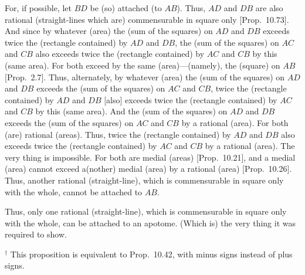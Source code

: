 \begin{Parallel}{}{}
{For, if possible, let $BD$ be (so) attached (to $AB$). Thus, $AD$ and $DB$ are also
rational (straight-lines which are) commensurable in square only [Prop.~10.73]. And since by whatever (area)
the (sum of the squares) on $AD$ and $DB$ exceeds twice the
(rectangle contained) by $AD$ and $DB$, the (sum of the squares)
on $AC$ and $CB$ also exceeds twice the (rectangle contained) by $AC$ and
$CB$ by this (same area). For both exceed by the same (area)---(namely), the (square)
on $AB$ [Prop.~2.7]. Thus, alternately, 
by whatever (area) the (sum of the squares) on $AD$ and 
$DB$ exceeds the (sum of the squares) on $AC$ and $CB$, 
 twice the (rectangle contained) by $AD$ and $DB$
[also] exceeds twice the (rectangle contained) by $AC$ and $CB$ by this (same area).
And the (sum of the squares) on $AD$ and $DB$ exceeds the (sum
of the squares) on $AC$ and $CB$ by a rational (area). For both
(are) rational (areas). Thus, twice the (rectangle contained) by $AD$ and $DB$ also
exceeds twice the (rectangle contained) by $AC$ and $CB$ by a
rational (area). The very thing is impossible. For both are
medial (areas) [Prop.~10.21],
and a medial (area) cannot exceed a(nother) medial (area) by a rational
(area) [Prop.~10.26].  
Thus, another rational (straight-line), which is commensurable in  square only with the whole, cannot
be attached to $AB$.

Thus, only one rational (straight-line), which is
commensurable in square only with the whole, can be attached to an apotome.
(Which is) the very thing it was required to show.}
\end{Parallel}
{\footnotesize\noindent$^\dag$ This proposition is equivalent to 
Prop.~10.42, with minus signs instead of
plus signs.}

